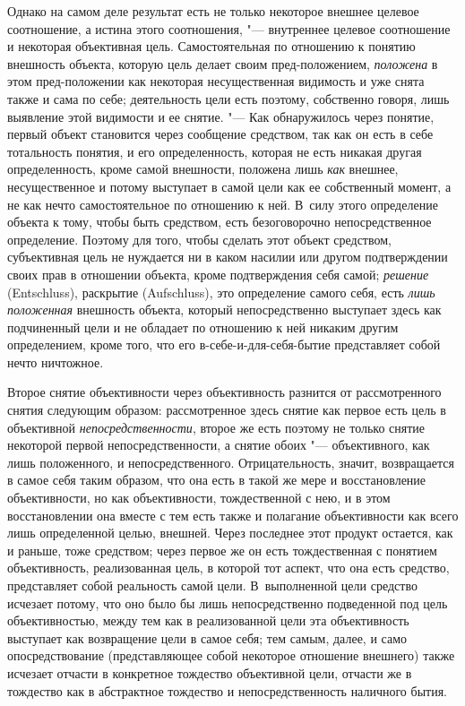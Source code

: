 Однако на самом деле результат есть не только некоторое
внешнее целевое соотношение, а истина этого соотношения, "---
внутреннее целевое соотношение и некоторая объективная цель.
Самостоятельная по отношению к понятию внешность объекта, которую цель
делает своим пред-положением,
{\em положена} в этом
пред-положении как некоторая несущественная видимость и уже
снята также и сама по себе; деятельность цели есть поэтому, собственно
говоря, лишь выявление этой видимости и ее снятие. "--- Как
обнаружилось через понятие, первый объект становится через сообщение
средством, так как он есть в себе тотальность понятия, и его
определенность, которая не есть никакая другая определенность, кроме самой
внешности, положена лишь {\em как}
внешнее, несущественное и потому выступает в самой цели как
ее собственный момент, а не как нечто самостоятельное по отношению к ней.
В~силу этого определение объекта к тому, чтобы быть средством, есть
безоговорочно непосредственное определение. Поэтому для того, чтобы сделать
этот объект средством, субъективная цель не нуждается ни в каком насилии
или другом подтверждении своих прав в отношении объекта, кроме
подтверждения себя самой; {\em решение}
(Entschluss), раскрытие (Aufschluss), это
определение самого себя, есть {\em лишь
положенная} внешность объекта, который непосредственно
выступает здесь как подчиненный цели и не обладает по отношению к ней
никаким другим определением, кроме того, что его
в-себе-и-для-себя-бытие представляет собой нечто ничтожное.

Второе снятие объективности через объективность разнится от
рассмотренного снятия следующим образом: рассмотренное здесь снятие как
первое есть цель в объективной
{\em непосредственности},
второе же есть поэтому не только снятие некоторой первой
непосредственности, а снятие обоих "--- объективного, как лишь
положенного, и непосредственного. Отрицательность, значит, возвращается в
самое себя таким образом, что она есть в такой же мере и восстановление
объективности, но как объективности, тождественной с нею, и в этом
восстановлении она вместе с тем есть также и полагание объективности как
всего лишь определенной целью, внешней. Через последнее этот продукт
остается, как и раньше, тоже средством; через первое же он есть
тождественная с понятием объективность, реализованная цель, в которой тот
аспект, что она есть средство, представляет собой реальность самой цели.
В~выполненной цели средство исчезает потому, что оно было бы лишь
непосредственно подведенной под цель объективностью, между тем как в
реализованной цели эта объективность выступает как возвращение цели в самое
себя; тем самым, далее, и само опосредствование (представляющее собой
некоторое отношение внешнего) также исчезает отчасти в конкретное тождество
объективной цели, отчасти же в тождество как в абстрактное тождество и
непосредственность наличного бытия.

